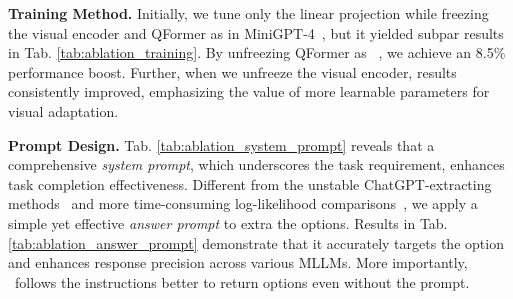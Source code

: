 \begin{table}[tp]
    \centering
    \setlength\tabcolsep{3.0pt}
    \vspace{-0.3cm}
    \caption{\textbf{Answer Prompt.} 
    `$\varnothing$' indicates directly matching the option within responses, similar to~\cite{mmbench}.
    Our simple yet effective prompt enhances response precision across various MLLMs.
    }
    \label{tab:ablation_answer_prompt}
    \vspace{-0.3cm}
\end{table}
\textbf{Training Method.}
Initially, 
we tune only the linear projection while freezing the visual encoder and QFormer as in MiniGPT-4~\cite{minigpt4},
but it yielded subpar results in Tab. \ref{tab:ablation_training}. 
By unfreezing QFormer as ~\cite{instructblip}, 
we achieve an 8.5\% performance boost. 
Further, when we unfreeze the visual encoder, 
results consistently improved, 
emphasizing the value of more learnable parameters for visual adaptation.

\textbf{Prompt Design.}
Tab. \ref{tab:ablation_system_prompt} reveals that a comprehensive \textit{system prompt}, which underscores the task requirement, enhances task completion effectiveness.
Different from the unstable ChatGPT-extracting methods~\cite{mmbench} and more time-consuming log-likelihood comparisons~\cite{seedbench}, 
we apply a simple yet effective \textit{answer prompt} to extra the options.
Results in Tab. \ref{tab:ablation_answer_prompt} demonstrate that it accurately targets the option and enhances response precision across various MLLMs.
More importantly,
\ModelName\ follows the instructions better to return options even without the prompt.

